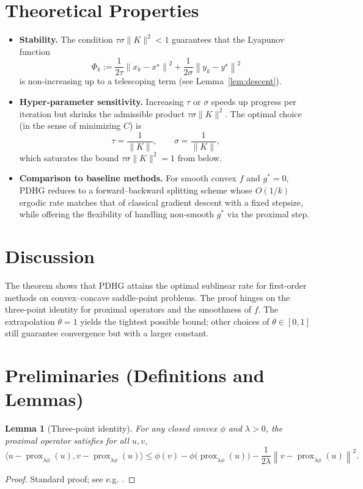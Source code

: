 \documentclass{article}
\newtheorem{lemma}{Lemma}
\newcommand{\prox}{\operatorname{prox}}
\newcommand{\ip}[2]{\langle #1,#2\rangle}
\newcommand{\norm}[1]{\left\|#1\right\|}
\begin{document}
\section*{Theoretical Properties}
\begin{itemize}
\item \textbf{Stability.} The condition $\tau\sigma\|K\|^{2}<1$ guarantees that the Lyapunov function 
\[
\Phi_{k}:=\frac{1}{2\tau}\norm{x_{k}-x^{\star}}^{2}
          +\frac{1}{2\sigma}\norm{y_{k}-y^{\star}}^{2}
\tag{9}
\]
is non‑increasing up to a telescoping term (see Lemma~\ref{lem:descent}).
\item \textbf{Hyper‑parameter sensitivity.}
Increasing $\tau$ or $\sigma$ speeds up progress per iteration but shrinks the admissible product $\tau\sigma\|K\|^{2}$. The optimal choice (in the sense of minimizing $C$) is 
\[
\tau=\frac{1}{\|K\|},\qquad\sigma=\frac{1}{\|K\|},
\tag{10}
\]
which saturates the bound $\tau\sigma\|K\|^{2}=1$ from below.
\item \textbf{Comparison to baseline methods.}
For smooth convex $f$ and $g^{*}=0$, PDHG reduces to a forward–backward splitting scheme whose $O(1/k)$ ergodic rate matches that of classical gradient descent with a fixed stepsize, while offering the flexibility of handling non‑smooth $g^{*}$ via the proximal step.
\end{itemize}

\section*{Discussion}
The theorem shows that PDHG attains the optimal sublinear rate for first‑order methods on convex–concave saddle‑point problems. The proof hinges on the three‑point identity for proximal operators and the smoothness of $f$. The extrapolation $\theta=1$ yields the tightest possible bound; other choices of $\theta\in[0,1]$ still guarantee convergence but with a larger constant.

\newpage
\section*{Preliminaries (Definitions and Lemmas)}
\begin{lemma}[Three‑point identity]\label{lem:prox}
For any closed convex $\phi$ and $\lambda>0$, the proximal operator satisfies for all $u,v$,
\[
\ip{u-\prox_{\lambda\phi}(u)}{v-\prox_{\lambda\phi}(u)}\le
\phi(v)-\phi\!\bigl(\prox_{\lambda\phi}(u)\bigr)-\frac{1}{2\lambda}\norm{v-\prox_{\lambda\phi}(u)}^{2}.
\tag{11}
\]
\end{lemma}
\begin{proof}
Standard proof; see e.g. \cite{Combettes2005}.
\end{proof}
\end{document}
